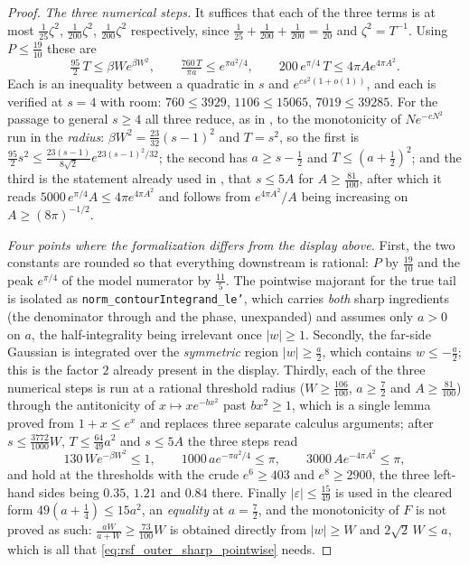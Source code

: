 \begin{proof}
\emph{The three numerical steps.}  It suffices that each of the three terms is at most
$\tfrac1{25}\zeta^{2}$, $\tfrac1{200}\zeta^{2}$, $\tfrac1{200}\zeta^{2}$ respectively, since
$\tfrac1{25}+\tfrac1{200}+\tfrac1{200}=\tfrac1{20}$ and $\zeta^{2}=T^{-1}$.  Using
$P\le\tfrac{19}{10}$ these are
\[
  \tfrac{95}2\,T\le\beta We^{\beta W^{2}},\qquad
  \tfrac{760\,T}{\pi a}\le e^{\pi a^{2}/4},\qquad
  200\,e^{\pi/4}\,T\le4\pi Ae^{4\pi A^{2}} .
\]
Each is an inequality between a quadratic in $s$ and $e^{cs^{2}(1+o(1))}$, and each is verified
at $s=4$ with room: $760\le3929$, $1106\le15065$, $7019\le39285$.  For the passage to general
$s\ge4$ all three reduce, as in , to the monotonicity of
$Ne^{-cN^{2}}$ run in the \emph{radius}: $\beta W^{2}=\tfrac{23}{32}(s-1)^{2}$
and $T=s^{2}$, so the first is $\tfrac{95}2s^{2}\le\tfrac{23(s-1)}{8\sqrt2}
e^{23(s-1)^{2}/32}$; the second has $a\ge s-\tfrac12$ and $T\le(a+\tfrac12)^{2}$; and the third
is the statement already used in , that $s\le5A$ for
$A\ge\tfrac{81}{100}$, after which it reads
$5000\,e^{\pi/4}A\le4\pi e^{4\pi A^{2}}$ and follows from $e^{4\pi A^{2}}/A$ being increasing on
$A\ge(8\pi)^{-1/2}$.

\emph{Four points where the formalization differs from the display above.}
First, the two constants are rounded so that everything downstream is rational: $P$ by
$\tfrac{19}{10}$ and the peak $e^{\pi/4}$ of the model numerator by $\tfrac{11}5$.  The pointwise
majorant for the true tail is isolated as \texttt{norm\_contourIntegrand\_le'}, which carries
\emph{both} sharp ingredients (the denominator through  and the
phase, unexpanded) and assumes only $a>0$ on $a$, the half-integrality being irrelevant once
$\lvert w\rvert\ge1$.  Secondly, the far-side Gaussian is integrated over the
\emph{symmetric} region $\lvert w\rvert\ge\tfrac a2$, which contains $w\le-\tfrac a2$; this is the
factor $2$ already present in the display.  Thirdly, each of the three numerical steps is run at a
rational threshold radius ($W\ge\tfrac{106}{100}$, $a\ge\tfrac72$ and
$A\ge\tfrac{81}{100}$) through the antitonicity of $x\mapsto xe^{-bx^{2}}$ past $bx^{2}\ge1$,
which is a single lemma proved from $1+x\le e^{x}$ and replaces three separate calculus arguments;
after $s\le\tfrac{3772}{1000}W$, $T\le\tfrac{64}{49}a^{2}$ and $s\le5A$ the three steps read
\[
  130\,We^{-\beta W^{2}}\le1,\qquad
  1000\,ae^{-\pi a^{2}/4}\le\pi,\qquad
  3000\,Ae^{-4\pi A^{2}}\le\pi ,
\]
and hold at the thresholds with the crude $e^{6}\ge403$ and $e^{8}\ge2900$, the three left-hand
sides being $0.35$, $1.21$ and $0.84$ there.  Finally $\lvert\varepsilon\rvert\le\tfrac{15}{49}$ is
used in the cleared form $49(a+\tfrac14)\le15a^{2}$, an \emph{equality} at $a=\tfrac72$, and the
monotonicity of $F$ is not proved as such: $\tfrac{aW}{a+W}\ge\tfrac{73}{100}W$ is obtained
directly from $\lvert w\rvert\ge W$ and $2\sqrt2\,W\le a$, which is all that
\eqref{eq:rsf_outer_sharp_pointwise} needs.
\end{proof}

